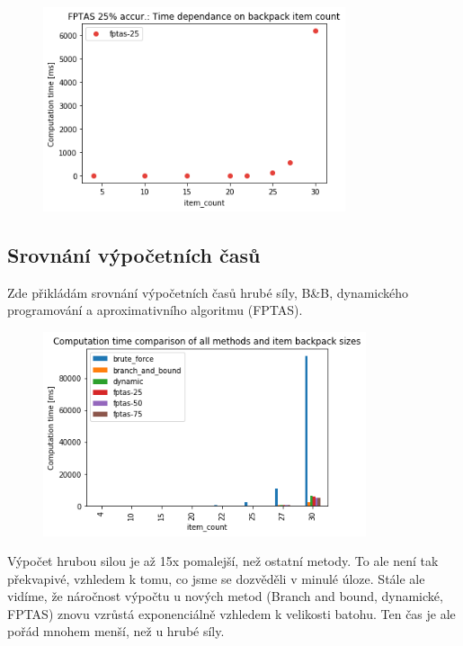 \documentclass[a4paper,10pt,twocolumn]{article}
\begin{document}
\begin{figure}[H]
  \begin{center}
    \includegraphics[height=6cm]{graphs/fptas25_speed.png}
  \end{center}
\end{figure}



\subsection{Srovnání výpočetních časů}


Zde přikládám srovnání výpočetních časů hrubé síly, B\&B, dynamického programování a aproximativního algoritmu (FPTAS).

\begin{figure}[H]
  \begin{center}
    \includegraphics[height=6cm]{graphs/all_speed_comparison.png}
  \end{center}
\end{figure}

Výpočet hrubou silou je až 15x pomalejší, než ostatní metody. To ale není tak překvapivé, vzhledem k tomu, co jsme se dozvěděli v minulé úloze. 
Stále ale vidíme, že náročnost výpočtu u nových metod (Branch and bound, dynamické, FPTAS) znovu vzrůstá exponenciálně vzhledem k velikosti batohu. Ten čas je ale pořád mnohem menší, než u hrubé síly.
\end{document}
